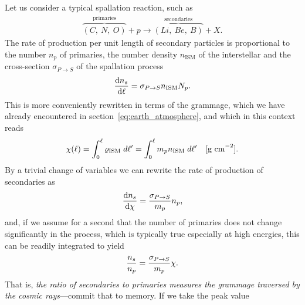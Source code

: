 Let us consider a typical spallation reaction, such as
\begin{align*}
  \overbrace{(C,~N,~O)}^{\text{primaries}} + p \rightarrow
  \overbrace{(Li,~Be,~B)}^{\text{secondaries}} + X.
\end{align*}
The rate of production per unit length of secondary particles is proportional to
the number $n_p$ of primaries, the number density $n_\text{ISM}$ of the interstellar
and the cross-section $\sigma_{P\rightarrow S}$ of the spallation process
\begin{align*}
  \dv{n_s}{\ell} = \sigma_{P\rightarrow S} n_\text{ISM} N_p.
\end{align*}
This is more conveniently rewritten in terms of the grammage, which we have already
encountered in section~\ref{eq:earth_atmosphere}, and which in this context
reads
\begin{align*}
   \chi(\ell) = \int_0^\ell \varrho_\text{ISM} \;d{\ell'} =
    \int_0^\ell m_p n_\text{ISM} \;d{\ell'}
    \quad \text{[g~cm}^{-2}\text{]}.
\end{align*}
By a trivial change of variables we can rewrite the rate of production of secondaries as
\begin{align*}
  \dv{n_s}{\ensuremath{\chi}} = \frac{\sigma_{P\rightarrow S}}{m_p} n_p,
\end{align*}
and, if we assume for a second that the number of primaries does not change significantly
in the process, which is typically true especially at high energies, this
can be readily integrated to yield
\begin{align}
  \frac{n_s}{n_p} = \frac{\sigma_{P\rightarrow S}}{m_p} \chi.
\end{align}
That is, \emph{the ratio of secondaries to primaries measures the grammage
traversed by the cosmic rays}---commit that to memory. If we take the peak value
